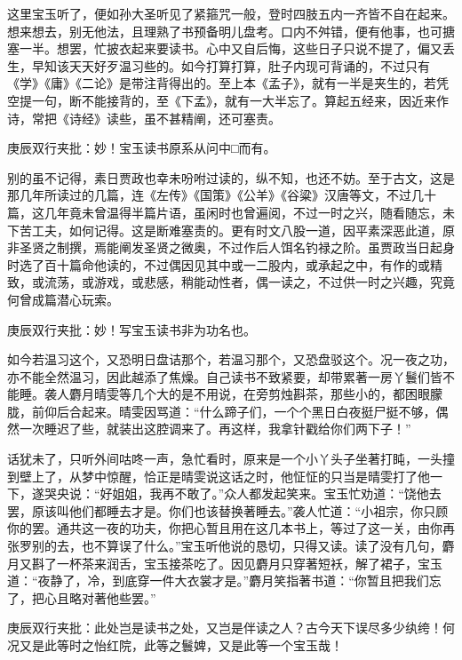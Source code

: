 \begin{parag}


    这里宝玉听了，便如孙大圣听见了紧箍咒一般，登时四肢五内一齐皆不自在起来。想来想去，别无他法，且理熟了书预备明儿盘考。口内不舛错，便有他事，也可搪塞一半。想罢，忙披衣起来要读书。心中又自后悔，这些日子只说不提了，偏又丢生，早知该天天好歹温习些的。如今打算打算，肚子内现可背诵的，不过只有《学》《庸》《二论》是带注背得出的。至上本《孟子》，就有一半是夹生的，若凭空提一句，断不能接背的，至《下孟》，就有一大半忘了。算起五经来，因近来作诗，常把《诗经》读些，虽不甚精阐，还可塞责。\begin{note}庚辰双行夹批：妙！宝玉读书原系从问中□而有。\end{note}别的虽不记得，素日贾政也幸未吩咐过读的，纵不知，也还不妨。至于古文，这是那几年所读过的几篇，连《左传》《国策》《公羊》《谷粱》汉唐等文，不过几十篇，这几年竟未曾温得半篇片语，虽闲时也曾遍阅，不过一时之兴，随看随忘，未下苦工夫，如何记得。这是断难塞责的。更有时文八股一道，因平素深恶此道，原非圣贤之制撰，焉能阐发圣贤之微奥，不过作后人饵名钓禄之阶。虽贾政当日起身时选了百十篇命他读的，不过偶因见其中或一二股内，或承起之中，有作的或精致，或流荡，或游戏，或悲感，稍能动性者，偶一读之，不过供一时之兴趣，究竟何曾成篇潜心玩索。\begin{note}庚辰双行夹批：妙！写宝玉读书非为功名也。\end{note}如今若温习这个，又恐明日盘诘那个，若温习那个，又恐盘驳这个。况一夜之功，亦不能全然温习，因此越添了焦燥。自己读书不致紧要，却带累著一房丫鬟们皆不能睡。袭人麝月晴雯等几个大的是不用说，在旁剪烛斟茶，那些小的，都困眼朦胧，前仰后合起来。晴雯因骂道：“什么蹄子们，一个个黑日白夜挺尸挺不够，偶然一次睡迟了些，就装出这腔调来了。再这样，我拿针戳给你们两下子！”
\end{parag}


\begin{parag}


    话犹未了，只听外间咕咚一声，急忙看时，原来是一个小丫头子坐著打盹，一头撞到壁上了，从梦中惊醒，恰正是晴雯说这话之时，他怔怔的只当是晴雯打了他一下，遂哭央说：“好姐姐，我再不敢了。”众人都发起笑来。宝玉忙劝道：“饶他去罢，原该叫他们都睡去才是。你们也该替换著睡去。”袭人忙道：“小祖宗，你只顾你的罢。通共这一夜的功夫，你把心暂且用在这几本书上，等过了这一关，由你再张罗别的去，也不算误了什么。”宝玉听他说的恳切，只得又读。读了没有几句，麝月又斟了一杯茶来润舌，宝玉接茶吃了。因见麝月只穿著短袄，解了裙子，宝玉道：“夜静了，冷，到底穿一件大衣裳才是。”麝月笑指著书道：“你暂且把我们忘了，把心且略对著他些罢。”\begin{note}庚辰双行夹批：此处岂是读书之处，又岂是伴读之人？古今天下误尽多少纨绔！何况又是此等时之怡红院，此等之鬟婢，又是此等一个宝玉哉！\end{note}
\end{parag}


